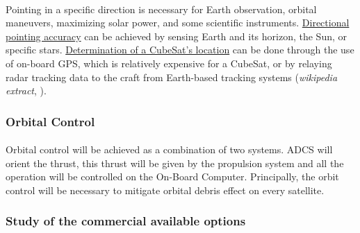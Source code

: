 \paragraph{} Pointing in a specific direction is necessary for Earth observation, orbital maneuvers, maximizing solar power, and some scientific instruments. \underline{Directional pointing accuracy} can be achieved by sensing Earth and its horizon, the Sun, or specific stars. \underline{Determination of a CubeSat's location} can be done through the use of on-board GPS, which is relatively expensive for a CubeSat, or by relaying radar tracking data to the craft from Earth-based tracking systems (\textit{wikipedia extract}, \cite{Macdonald2014}).
\subsubsection{Orbital Control}
\paragraph{} Orbital control will be achieved as a combination of two systems. ADCS will orient the thrust, this thrust will be given by the propulsion system and all the operation will be controlled on the On-Board Computer. Principally, the orbit control will be necessary to mitigate orbital debris effect on every satellite.
\subsubsection{Study of the commercial available options}
